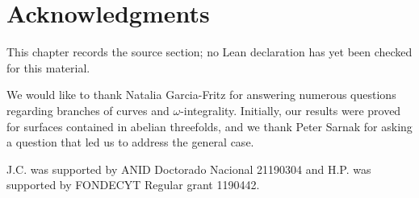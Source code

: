 \chapter{Acknowledgments}
\label{chabauty-coleman-bound-surfaces-chapter-11}

\begin{remark}
\label{chabauty-coleman-bound-surfaces-chapter-11-source}
This chapter records the source section; no Lean declaration has yet been checked for this material.
\notready
\end{remark}

We would like to thank Natalia Garcia-Fritz for answering numerous questions regarding branches of curves and $\omega$-integrality. Initially, our results were proved for surfaces contained in abelian threefolds, and we thank Peter Sarnak for asking a question that led us to address the general case.




J.C. was supported by ANID Doctorado Nacional 21190304 and H.P. was supported by FONDECYT Regular grant 1190442.
%
%
%

